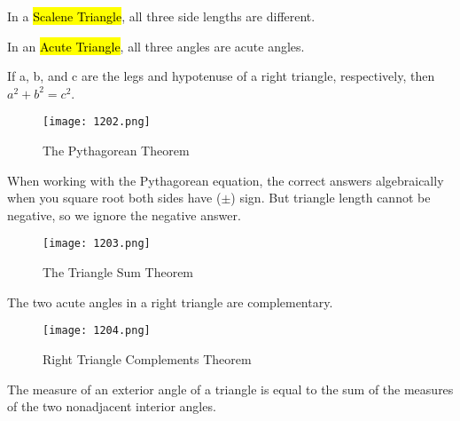 In a \hl{Scalene Triangle}, all three side lengths are different.

In an \hl{Acute Triangle}, all three angles are acute angles.

\vspace{.4cm}

\begin{tcolorbox}[colback=Red!5!white,colframe=Red!75!black,title=The Pythagorean Theorem]
  If a, b, and c are the legs and hypotenuse of a right triangle, respectively, then $a^{2}+b^{2}=c^{2}$.
\end{tcolorbox}

\begin{figure}[htb!]
  \centering
  \texttt{[image: 1202.png]}
  \caption{The Pythagorean Theorem}
\end{figure}

\newpage

When working with the Pythagorean equation, the correct answers algebraically when you square root both sides have ($\pm$) sign. But triangle length cannot be negative, so we ignore the negative answer.

\vspace{.5cm}

\begin{figure}[htb!]
  \centering
  \texttt{[image: 1203.png]}
  \caption{The Triangle Sum Theorem}
\end{figure}


\begin{tcolorbox}[colback=Red!5!white,colframe=Red!75!black,title=Right Triangle Complements Theorem (unimportant)]
  The two acute angles in a right triangle are complementary.
\end{tcolorbox}

\begin{figure}[htb!]
  \centering
  \texttt{[image: 1204.png]}
  \caption{Right Triangle Complements Theorem}
\end{figure}

\begin{tcolorbox}[colback=Red!5!white,colframe=Red!75!black,title=Exterior Angle Theorem (unimportant)]
  The measure of an exterior angle of a triangle is equal to the sum of the measures of the two nonadjacent interior angles.
\end{tcolorbox}

